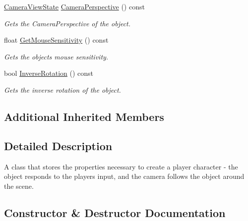 \begin{DoxyCompactItemize}
\mbox{\hyperlink{_camera_view_state_8h_a63f3f328e010721669880ed43f58cabf}{Camera\+View\+State}} \mbox{\hyperlink{class_player_character_a7a1a39b5ecd9b71c5d7a8a282b4ae96a}{Camera\+Perspective}} () const
\begin{DoxyCompactList}\small\item\em Gets the Camera\+Perspective of the object. \end{DoxyCompactList}\item 
float \mbox{\hyperlink{class_player_character_a93e89332fa54a179bdb73d25df23a270}{Get\+Mouse\+Sensitivity}} () const
\begin{DoxyCompactList}\small\item\em Gets the object\textquotesingle{}s mouse sensitivity. \end{DoxyCompactList}\item 
bool \mbox{\hyperlink{class_player_character_ad399d3e443c27f450d8f7a32054484de}{Inverse\+Rotation}} () const
\begin{DoxyCompactList}\small\item\em Gets the inverse rotation of the object. \end{DoxyCompactList}\end{DoxyCompactItemize}
\subsection*{Additional Inherited Members}


\subsection{Detailed Description}
A class that stores the properties necessary to create a player character -\/ the object responds to the player\textquotesingle{}s input, and the camera follows the object around the scene. 

\subsection{Constructor \& Destructor Documentation}
\mbox{\label{class_player_character_adfaef348eb262071e4dfb1965e9baa73}} 
